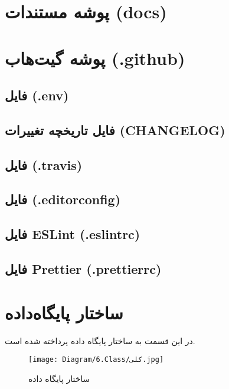 \section{پوشه مستندات (docs)}


\section{پوشه گیت‌هاب (.github)}


\subsection{فایل  (.env)}


\subsection{فایل تاریخچه تغییرات (CHANGELOG)}


\subsection{فایل  (.travis)}


\subsection{فایل  (.editorconfig)}


\subsection{فایل ESLint (.eslintrc)}


\subsection{فایل Prettier (.prettierrc)}





\section{ساختار پایگاه‌داده}
در این قسمت به ساختار پایگاه داده پرداخته شده است.
\begin{figure}[H]
	\texttt{[image: Diagram/6.Class/کلی.jpg]}
	\centering
	\caption{ساختار پایگاه داده}
	\label{fig:db:پایگاه}
\end{figure}

